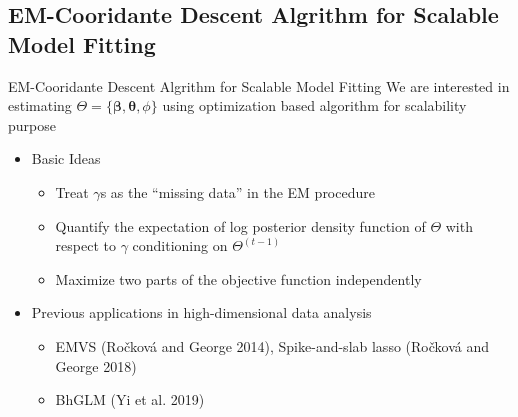 \documentclass[
  ignorenonframetext,
  aspectratio=169]{beamer}
\providecommand{\tightlist}{%
  \setlength{\itemsep}{0pt}\setlength{\parskip}{0pt}}
\begin{document}
\hypertarget{em-cooridante-descent-algrithm-for-scalable-model-fitting}{%
\subsection{EM-Cooridante Descent Algrithm for Scalable Model
Fitting}\label{em-cooridante-descent-algrithm-for-scalable-model-fitting}}

\begin{frame}{EM-Cooridante Descent Algrithm for Scalable Model Fitting}
We are interested in estimating
\(\Theta = \{\bm \beta, \bm \theta, \phi\}\) using optimization based
algorithm for scalability purpose

\begin{itemize}
\tightlist
\item
  Basic Ideas

  \begin{itemize}
  \tightlist
  \item
    Treat \(\gamma\)s as the ``missing data'' in the EM procedure
  \item
    Quantify the expectation of log posterior density function of
    \(\Theta\) with respect to \(\gamma\) conditioning on
    \(\Theta^{(t-1)}\)
  \item
    Maximize two parts of the objective function independently
  \end{itemize}
\item
  Previous applications in high-dimensional data analysis

  \begin{itemize}
  \tightlist
  \item
    EMVS (Ročková and George 2014), Spike-and-slab lasso (Ročková and
    George 2018)
  \item
    BhGLM (Yi et al. 2019)
  \end{itemize}
\end{itemize}
\end{frame}
\end{document}
